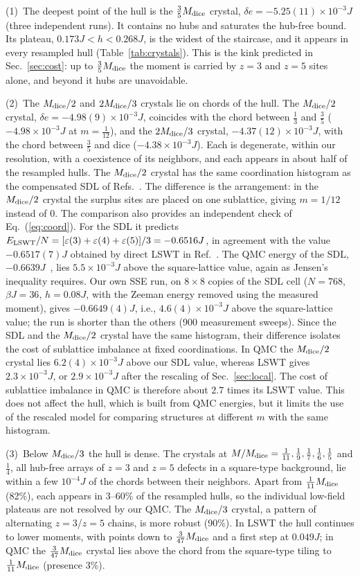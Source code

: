 \documentclass[prb,twocolumn,amsmath,amssymb,floatfix]{revtex4-2}
\newcommand{\Md}{M_{\rm dice}}
\newcommand{\eps}{\varepsilon}
\begin{document}
(1)~The deepest point of the hull is the $\frac35\Md$ crystal, $\delta e=-5.25(11)\times10^{-3}J$ (three independent runs). It contains no hubs and saturates the hub-free bound. Its plateau, $0.173J<h<0.268J$, is the widest of the staircase, and it appears in every resampled hull (Table~\ref{tab:crystals}). This is the kink predicted in Sec.~\ref{sec:cost}: up to $\frac35\Md$ the moment is carried by $z=3$ and $z=5$ sites alone, and beyond it hubs are unavoidable.

(2)~The $\Md/2$ and $2\Md/3$ crystals lie on chords of the hull. The $\Md/2$ crystal, $\delta e=-4.98(9)\times10^{-3}J$, coincides with the chord between $\frac13$ and $\frac35$ ($-4.98\times10^{-3}J$ at $m=\frac1{12}$), and the $2\Md/3$ crystal, $-4.37(12)\times10^{-3}J$, with the chord between $\frac35$ and dice ($-4.38\times10^{-3}J$). Each is degenerate, within our resolution, with a coexistence of its neighbors, and each appears in about half of the resampled hulls. The $\Md/2$ crystal has the same coordination histogram as the compensated SDL of Refs.~\cite{Jagannathan2012,Jagannathan2013}. The difference is the arrangement: in the $\Md/2$ crystal the surplus sites are placed on one sublattice, giving $m=1/12$ instead of $0$. The comparison also provides an independent check of Eq.~(\ref{eq:coord}). For the SDL it predicts $E_{\rm LSWT}/N=[\eps(3)+\eps(4)+\eps(5)]/3=-0.6516J$, in agreement with the value $-0.6517(7)J$ obtained by direct LSWT in Ref.~\cite{Jagannathan2013}. The QMC energy of the SDL, $-0.6639J$~\cite{Jagannathan2012}, lies $5.5\times10^{-3}J$ above the square-lattice value, again as Jensen's inequality requires. Our own SSE run, on $8\times8$ copies of the SDL cell ($N=768$, $\beta J=36$, $h=0.08J$, with the Zeeman energy removed using the measured moment), gives $-0.6649(4)J$, i.e., $4.6(4)\times10^{-3}J$ above the square-lattice value; the run is shorter than the others (900 measurement sweeps). Since the SDL and the $\Md/2$ crystal have the same histogram, their difference isolates the cost of sublattice imbalance at fixed coordinations. In QMC the $\Md/2$ crystal lies $6.2(4)\times10^{-3}J$ above our SDL value, whereas LSWT gives $2.3\times10^{-3}J$, or $2.9\times10^{-3}J$ after the rescaling of Sec.~\ref{sec:local}. The cost of sublattice imbalance in QMC is therefore about $2.7$ times its LSWT value. This does not affect the hull, which is built from QMC energies, but it limits the use of the rescaled model for comparing structures at different $m$ with the same histogram.

(3)~Below $\Md/3$ the hull is dense. The crystals at $M/\Md=\frac1{11},\frac19,\frac17,\frac16,\frac15$ and $\frac14$, all hub-free arrays of $z=3$ and $z=5$ defects in a square-type background, lie within a few $10^{-4}J$ of the chords between their neighbors. Apart from $\frac1{11}\Md$ (82\%), each appears in 3--60\% of the resampled hulls, so the individual low-field plateaus are not resolved by our QMC. The $\Md/3$ crystal, a pattern of alternating $z=3$/$z=5$ chains, is more robust (90\%). In LSWT the hull continues to lower moments, with points down to $\frac3{47}\Md$ and a first step at $0.049J$; in QMC the $\frac3{47}\Md$ crystal lies above the chord from the square-type tiling to $\frac1{11}\Md$ (presence 3\%).
\end{document}
